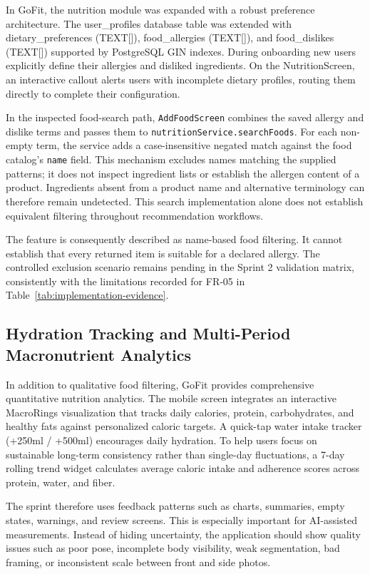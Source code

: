 \documentclass[12pt,a4paper,openany]{report}
\begin{document}
In GoFit, the nutrition module was expanded with a robust preference architecture. The user\_profiles database table was extended with dietary\_preferences (TEXT[]), food\_allergies (TEXT[]), and food\_dislikes (TEXT[]) supported by PostgreSQL GIN indexes. During onboarding  new users explicitly define their allergies and disliked ingredients. On the NutritionScreen, an interactive callout alerts users with incomplete dietary profiles, routing them directly to complete their configuration.


In the inspected food-search path, \texttt{AddFoodScreen} combines the saved allergy and dislike terms and passes them to \texttt{nutritionService.searchFoods}. For each non-empty term, the service adds a case-insensitive negated match against the food catalog's \texttt{name} field. This mechanism excludes names matching the supplied patterns; it does not inspect ingredient lists or establish the allergen content of a product. Ingredients absent from a product name and alternative terminology can therefore remain undetected. This search implementation alone does not establish equivalent filtering throughout recommendation workflows.

The feature is consequently described as name-based food filtering. It cannot establish that every returned item is suitable for a declared allergy. The controlled exclusion scenario remains pending in the Sprint 2 validation matrix, consistently with the limitations recorded for FR-05 in Table~\ref{tab:implementation-evidence}.


\subsection{Hydration Tracking and Multi-Period Macronutrient Analytics}

In addition to qualitative food filtering, GoFit provides comprehensive quantitative nutrition analytics. The mobile screen integrates an interactive MacroRings visualization that tracks daily calories, protein, carbohydrates, and healthy fats against personalized caloric targets. A quick-tap water intake tracker (+250ml / +500ml) encourages daily hydration. To help users focus on sustainable long-term consistency rather than single-day fluctuations, a 7-day rolling trend widget calculates average caloric intake and adherence scores across protein, water, and fiber.


The sprint therefore uses feedback patterns such as charts, summaries, empty states, warnings, and review screens. This is especially important for AI-assisted measurements. Instead of hiding uncertainty, the application should show quality issues such as poor pose, incomplete body visibility, weak segmentation, bad framing, or inconsistent scale between front and side photos.
\end{document}

